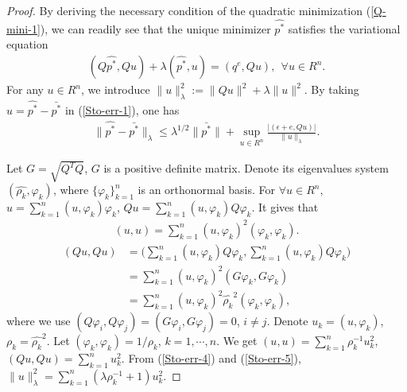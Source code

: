 \documentclass[10pt,a4paper]{amsart}
\begin{document}
\begin{proof} 
By deriving the necessary condition of the quadratic minimization (\ref{Q-mini-1}), we can readily see that the unique minimizer $\hat{p^*}$ satisfies the
variational equation
\begin{align}\label{Sto-err-1}
(Q\hat{p^*},Qu)+\lambda(\hat{p^*},u)=(q^e,Qu),~~\forall u\in R^n.
\end{align}
For any $u\in R^n$, we introduce $\| u \|_{\lambda}^2:=\|Qu\|^2+\lambda\|u\|^2$. By taking $u=\hat{p^*}-\bar{p^*}$ in (\ref{Sto-err-1}), one has
\begin{align}\label{Sto-err-3}
\| \hat{p^*}-\bar{p^*}\|_{\lambda}\leq \lambda^{1/2}\|\bar{p^*}\|+\sup\limits_{u\in R^n}\frac{|(\epsilon+e,Qu)|}{\| u \|_{\lambda}}.
\end{align}

Let $G=\sqrt{Q^TQ}$, $G$ is a positive definite matrix. Denote its eigenvalues system $(\hat{\rho_k},\varphi_k)$, where $\{\varphi_k\}_{k=1}^n$ is an orthonormal basis.
For $\forall u\in R^n$, $u=\sum_{k=1}^n(u,\varphi_k)\varphi_k$, $Qu=\sum_{k=1}^n(u,\varphi_k)Q\varphi_k$. It gives that
\begin{align}\label{Sto-err-4}
(u,u)=\sum_{k=1}^n(u,\varphi_k)^2(\varphi_k,\varphi_k).
\end{align}
\begin{align}\label{Sto-err-5}
(Qu,Qu)
&=\bigg(\sum_{k=1}^n(u,\varphi_k)Q\varphi_k,\sum_{k=1}^n(u,\varphi_k)Q\varphi_k\bigg)\\ \nonumber
&=\sum_{k=1}^n(u,\varphi_k)^2(G\varphi_k,G\varphi_k)\\ \nonumber
&=\sum_{k=1}^n(u,\varphi_k)^2\hat{\rho_k}^2(\varphi_k,\varphi_k),
\end{align}
where we use $(Q\varphi_i,Q\varphi_j)=(G\varphi_i,G\varphi_j)=0$, $i\neq j$. Denote 
$u_k=(u,\varphi_k)$, $\rho_k=\hat{\rho_k}^2$. Let $(\varphi_k,\varphi_k)=1/\rho_k$, $k=1,\cdots,n$. We get $(u,u)=\sum_{k=1}^n\rho_k^{-1}u_k^2$, $(Qu,Qu)=\sum_{k=1}^nu_k^2$.
From (\ref{Sto-err-4}) and (\ref{Sto-err-5}), $\| u\|_{\lambda}^2=\sum_{k=1}^n(\lambda\rho_k^{-1}+1)u_k^2$.


\end{proof}
\end{document}
